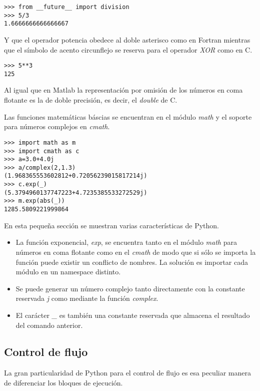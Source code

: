 \documentclass[a4paper,10pt]{article}
\begin{document}
\begin{lstlisting}
>>> from __future__ import division
>>> 5/3
1.6666666666666667
\end{lstlisting}

Y que el operador potencia obedece al doble asterisco como en Fortran
mientras que el símbolo de acento circunflejo se reserva para el
operador \emph{XOR} como en C.

\begin{lstlisting}
>>> 5**3
125
\end{lstlisting}

Al igual que en Matlab la representación por omisión de los números en
coma flotante es la de doble precisión, es decir, el \emph{double} de
C.

Las funciones matemáticas báscias se encuentran en el módulo
\emph{math} y el soporte para números complejos en \emph{cmath}.

\begin{lstlisting}
>>> import math as m
>>> import cmath as c
>>> a=3.0+4.0j
>>> a/complex(2,1.3)
(1.968365553602812+0.72056239015817214j)
>>> c.exp(_)
(5.3794960137747223+4.7235385533272529j)
>>> m.exp(abs(_))
1285.5809221999864
\end{lstlisting}


En esta pequeña sección se muestran varias características de Python.

\begin{itemize}
\item La función exponencial, \emph{exp}, se encuentra tanto en el
  módulo \emph{math} para números en coma flotante como en el
  \emph{cmath} de modo que si sólo se importa la función puede existir
  un conflicto de nombres.  La solución es importar cada módulo en un
  namespace distinto.
\item Se puede generar un número complejo tanto directamente con la
  constante reservada \emph{j} como mediante la función \emph{complex}.
\item El carácter \emph{\_} es también una constante reservada que
  almacena el resultado del comando anterior.
\end{itemize}

\subsection{Control de flujo}

La gran particularidad de Python para el control de flujo es esa
peculiar manera de diferenciar los bloques de ejecución.
\end{document}
